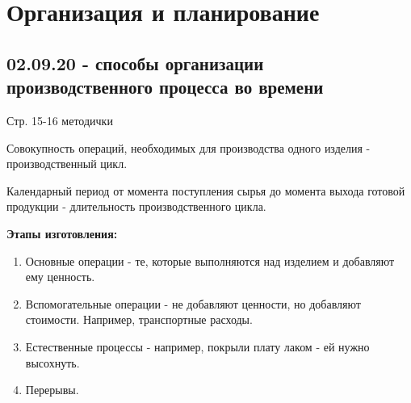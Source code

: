 



\section{Организация и планирование}

\subsection{02.09.20 - способы организации производственного процесса во времени}

\begin{figure}[h]
\end{figure}

\begin{remark}
	Стр. 15-16 методички
\end{remark}

Совокупность операций, необходимых для производства одного изделия - производственный цикл.

Календарный период от момента поступления сырья до момента выхода готовой продукции - длительность производственного цикла.

\noindent\textbf{Этапы изготовления: }

\begin{enumerate}
	\item Основные операции - те, которые выполняются над изделием и добавляют ему ценность. 
	\item Вспомогательные операции - не добавляют ценности, но добавляют стоимости. Например, транспортные расходы.
	\item Естественные процессы - например, покрыли плату лаком - ей нужно высохнуть.
	\item Перерывы.
\end{enumerate}

